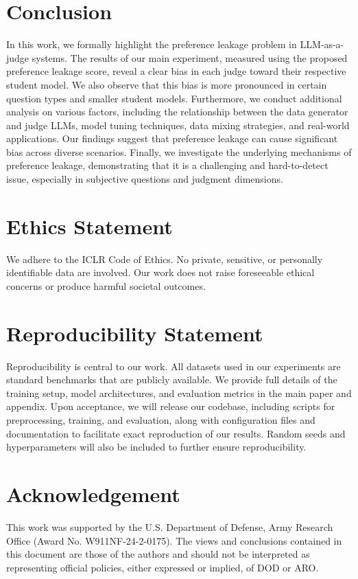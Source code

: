 \documentclass{article} %
\begin{document}
\section{Conclusion}
In this work, we formally highlight the preference leakage problem in LLM-as-a-judge systems. The results of our main experiment, measured using the proposed preference leakage score, reveal a clear bias in each judge toward their respective student model. We also observe that this bias is more pronounced in certain question types and smaller student models. Furthermore, we conduct additional analysis on various factors, including the relationship between the data generator and judge LLMs, model tuning techniques, data mixing strategies, and real-world applications. Our findings suggest that preference leakage can cause significant bias across diverse scenarios. Finally, we investigate the underlying mechanisms of preference leakage, demonstrating that it is a challenging and hard-to-detect issue, especially in subjective questions and judgment dimensions.

\newpage
\section*{Ethics Statement}
We adhere to the ICLR Code of Ethics. No private, sensitive, or personally identifiable data are involved. Our work does not raise foreseeable ethical concerns or produce harmful societal outcomes.

\section*{Reproducibility Statement}
Reproducibility is central to our work. All datasets used in our experiments are standard benchmarks that are publicly available. We provide full details of the training setup, model architectures, and evaluation metrics in the main paper and appendix. Upon acceptance, we will release our codebase, including scripts for preprocessing, training, and evaluation, along with configuration files and documentation to facilitate exact reproduction of our results. Random seeds and hyperparameters will also be included to further ensure reproducibility.

\section*{Acknowledgement}
This work was supported by the U.S. Department of Defense, Army Research Office (Award No. W911NF-24-2-0175). The views and conclusions contained in this document are those of the authors and should not be interpreted as representing official policies, either expressed or implied, of DOD or ARO.
\end{document}
